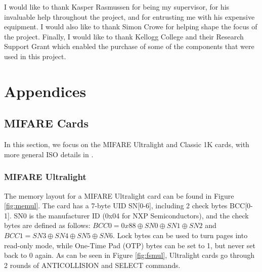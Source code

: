 \documentclass[fleqn,10pt]{SelfArx} %
\begin{document}
I would like to thank Kasper Rasmussen for being my supervisor, for his invaluable help throughout the project, and for entrusting me with his expensive equipment. I would also like to thank Simon Crowe for helping shape the focus of the project. Finally, I would like to thank Kellogg College and their Research Support Grant which enabled the purchase of some of the components that were used in this project.





\onecolumn
\appendix

\section*{Appendices}
\renewcommand{\thesubsection}{\Alph{subsection}}

\subsection{MIFARE Cards}
\label{app:mifare}
In this section, we focus on the MIFARE Ultralight and Classic 1K cards, with more general ISO details in \cite{iso144433}.

\subsubsection{MIFARE Ultralight \cite{ultralight}}
\label{app:ultralight}

The memory layout for a MIFARE Ultralight card can be found in Figure \ref{fig:memul}. The card has a 7-byte UID SN[0-6], including 2 check bytes BCC[0-1]. SN0 is the manufacturer ID (0x04 for NXP Semiconductors), and the check bytes are defined as follows: $BCC0=0x88 \oplus SN0 \oplus SN1 \oplus SN2$ and $BCC1 = SN3 \oplus SN4 \oplus SN5 \oplus SN6$. Lock bytes can be used to turn pages into read-only mode, while One-Time Pad (OTP) bytes can be set to 1, but never set back to 0 again. As can be seen in Figure \ref{fig:fsmul}, Ultralight cards go through 2 rounds of ANTICOLLISION and SELECT commands.
\end{document}
